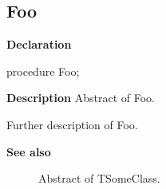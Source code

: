 \documentclass{report}
\newif\ifpdf
\begin{document}
\subsection*{Foo}
\fi
\label{ok_see_also-Foo}
\begin{list}{}{
\setlength{\itemindent}{0cm}
\setlength{\listparindent}{0cm}
\setlength{\leftmargin}{\evensidemargin}
\addtolength{\leftmargin}{\tmplength}
\settowidth{\labelsep}{X}
\addtolength{\leftmargin}{\labelsep}
\setlength{\labelwidth}{\tmplength}
}
\item[\textbf{Declaration}\hfill]
\ifpdf
\begin{flushleft}
\fi
\begin{ttfamily}
procedure Foo;\end{ttfamily}

\ifpdf
\end{flushleft}
\fi

\par
\item[\textbf{Description}]
Abstract of Foo.\hfill\vspace*{1ex}

 Further description of Foo. \item[\textbf{See also}]
\begin{description}
\item[\begin{ttfamily}TSomeClass\end{ttfamily}(\ref{ok_see_also.TSomeClass})] 
Abstract of TSomeClass.
\end{description}


\end{list}
\end{document}
